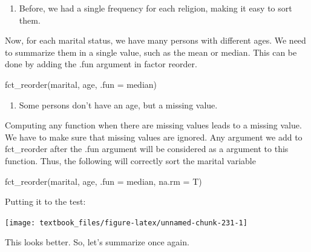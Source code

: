 \documentclass[]{tufte-book}
\newenvironment{Shaded}{}{}
\newcommand{\DataTypeTok}[1]{\textcolor[rgb]{0.56,0.13,0.00}{#1}}
\newcommand{\KeywordTok}[1]{\textcolor[rgb]{0.00,0.44,0.13}{\textbf{#1}}}
\newcommand{\NormalTok}[1]{#1}
\newcommand{\OperatorTok}[1]{\textcolor[rgb]{0.40,0.40,0.40}{#1}}
\newcommand{\StringTok}[1]{\textcolor[rgb]{0.25,0.44,0.63}{#1}}
\providecommand{\tightlist}{%
  \setlength{\itemsep}{0pt}\setlength{\parskip}{0pt}}
\begin{document}
\begin{enumerate}
\def\labelenumi{\arabic{enumi}.}
\tightlist
\item
  Before, we had a single frequency for each religion, making it easy to sort them.
\end{enumerate}

Now, for each marital status, we have many persons with different ages. We need to summarize them in a single value, such as the mean or median. This can be done by adding the .fun argument in factor reorder.

fct\_reorder(marital, age, .fun = median)

\begin{enumerate}
\def\labelenumi{\arabic{enumi}.}
\setcounter{enumi}{1}
\tightlist
\item
  Some persons don't have an age, but a missing value.
\end{enumerate}

Computing any function when there are missing values leads to a missing value. We have to make sure that missing values are ignored. Any argument we add to fct\_reorder after the .fun argument will be considered as a argument to this function. Thus, the following will correctly sort the marital variable

fct\_reorder(marital, age, .fun = median, na.rm = T)

Putting it to the test:

\begin{Shaded}
\end{Shaded}

\texttt{[image: textbook\_files/figure-latex/unnamed-chunk-231-1]}

This looks better. So, let's summarize once again.
\end{document}
